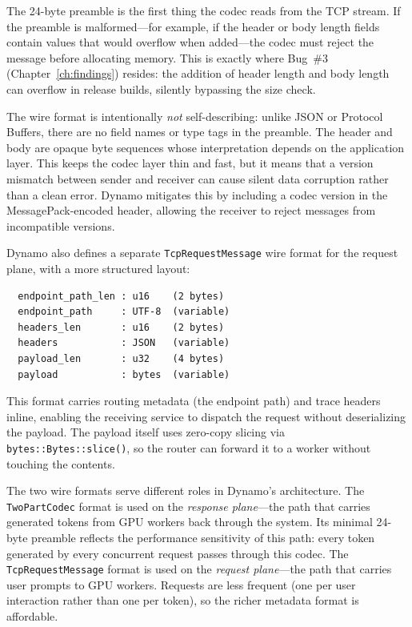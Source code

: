 \begin{notebox}
The 24-byte preamble is the first thing the codec reads from the TCP stream. If the preamble is malformed---for example, if the header or body length fields contain values that would overflow when added---the codec must reject the message before allocating memory. This is exactly where Bug~\#3 (Chapter~\ref{ch:findings}) resides: the addition of header length and body length can overflow in release builds, silently bypassing the size check.
\end{notebox}

The wire format is intentionally \emph{not} self-describing: unlike JSON or Protocol Buffers, there are no field names or type tags in the preamble. The header and body are opaque byte sequences whose interpretation depends on the application layer. This keeps the codec layer thin and fast, but it means that a version mismatch between sender and receiver can cause silent data corruption rather than a clean error. Dynamo mitigates this by including a codec version in the MessagePack-encoded header, allowing the receiver to reject messages from incompatible versions.

Dynamo also defines a separate \texttt{TcpRequestMessage} wire format for the request plane, with a more structured layout:

\begin{verbatim}
  endpoint_path_len : u16    (2 bytes)
  endpoint_path     : UTF-8  (variable)
  headers_len       : u16    (2 bytes)
  headers           : JSON   (variable)
  payload_len       : u32    (4 bytes)
  payload           : bytes  (variable)
\end{verbatim}

This format carries routing metadata (the endpoint path) and trace headers inline, enabling the receiving service to dispatch the request without deserializing the payload. The payload itself uses zero-copy slicing via \texttt{bytes::Bytes::slice()}, so the router can forward it to a worker without touching the contents.

The two wire formats serve different roles in Dynamo's architecture. The \texttt{TwoPartCodec} format is used on the \emph{response plane}---the path that carries generated tokens from GPU workers back through the system. Its minimal 24-byte preamble reflects the performance sensitivity of this path: every token generated by every concurrent request passes through this codec. The \texttt{TcpRequestMessage} format is used on the \emph{request plane}---the path that carries user prompts to GPU workers. Requests are less frequent (one per user interaction rather than one per token), so the richer metadata format is affordable.

